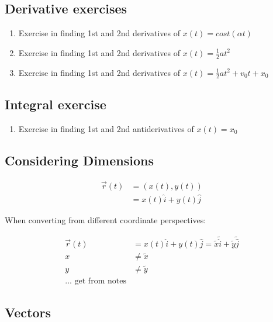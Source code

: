 \documentclass[11pt, notitlepage]{report}
\newcommand{\A}{\alpha}
\begin{document}
\newpage

\subsection{Derivative exercises}

\begin{enumerate}
	\item Exercise in finding 1st and 2nd derivatives of $x(t) = cost(\A t)$
	\item Exercise in finding 1st and 2nd derivatives of $x(t) = \frac{1}{2} at^2$
	\item Exercise in finding 1st and 2nd derivatives of $x(t) = \frac{1}{2} at^2 + v_0 t + x_0$

\end{enumerate}

\subsection{Integral exercise}

\begin{enumerate}
	\item Exercise in finding 1st and 2nd antiderivatives of $x(t) = x_0$

\end{enumerate}

\subsection{Considering Dimensions}

\begin{align}
	\overrightarrow{r}(t) &= (x(t), y(t)) \\
						  &= x(t)\hat{i} + y(t)\hat{j}
\end{align}

When converting from different coordinate perspectives:


\begin{align}
	\overrightarrow{r}(t) &= x(t)\hat{i} + y(t)\hat{j} = \tilde{x}\tilde{\hat{i}} + \tilde{y}\tilde{\hat{j}} \\
	x &\neq \tilde{x}\\
	y &\neq \tilde{y} \\
	\text{... get from notes}
\end{align}

\subsection{Vectors}
\end{document}
